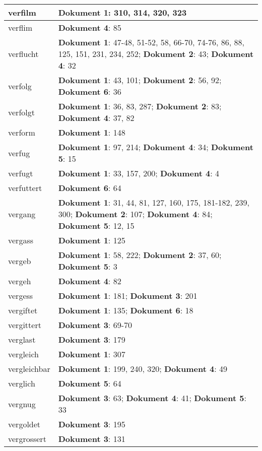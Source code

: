 \documentclass[a5paper]{article}
\begin{document}
\begin{longtable}[l]{|l|p{3in}|}
verfilm & \textbf{Dokument 1}: 310, 314, 320, 323 \\
\hline
verflim & \textbf{Dokument 4}: 85 \\
\hline
verflucht & \textbf{Dokument 1}: 47-48, 51-52, 58, 66-70, 74-76, 86, 88, 125, 151, 231, 234, 252; \textbf{Dokument 2}: 43; \textbf{Dokument 4}: 32 \\
\hline
verfolg & \textbf{Dokument 1}: 43, 101; \textbf{Dokument 2}: 56, 92; \textbf{Dokument 6}: 36 \\
\hline
verfolgt & \textbf{Dokument 1}: 36, 83, 287; \textbf{Dokument 2}: 83; \textbf{Dokument 4}: 37, 82 \\
\hline
verform & \textbf{Dokument 1}: 148 \\
\hline
verfug & \textbf{Dokument 1}: 97, 214; \textbf{Dokument 4}: 34; \textbf{Dokument 5}: 15 \\
\hline
verfugt & \textbf{Dokument 1}: 33, 157, 200; \textbf{Dokument 4}: 4 \\
\hline
verfuttert & \textbf{Dokument 6}: 64 \\
\hline
vergang & \textbf{Dokument 1}: 31, 44, 81, 127, 160, 175, 181-182, 239, 300; \textbf{Dokument 2}: 107; \textbf{Dokument 4}: 84; \textbf{Dokument 5}: 12, 15 \\
\hline
vergass & \textbf{Dokument 1}: 125 \\
\hline
vergeb & \textbf{Dokument 1}: 58, 222; \textbf{Dokument 2}: 37, 60; \textbf{Dokument 5}: 3 \\
\hline
vergeh & \textbf{Dokument 4}: 82 \\
\hline
vergess & \textbf{Dokument 1}: 181; \textbf{Dokument 3}: 201 \\
\hline
vergiftet & \textbf{Dokument 1}: 135; \textbf{Dokument 6}: 18 \\
\hline
vergittert & \textbf{Dokument 3}: 69-70 \\
\hline
verglast & \textbf{Dokument 3}: 179 \\
\hline
vergleich & \textbf{Dokument 1}: 307 \\
\hline
vergleichbar & \textbf{Dokument 1}: 199, 240, 320; \textbf{Dokument 4}: 49 \\
\hline
verglich & \textbf{Dokument 5}: 64 \\
\hline
vergnug & \textbf{Dokument 3}: 63; \textbf{Dokument 4}: 41; \textbf{Dokument 5}: 33 \\
\hline
vergoldet & \textbf{Dokument 3}: 195 \\
\hline
vergrossert & \textbf{Dokument 3}: 131 \\

\end{longtable}
\end{document}
